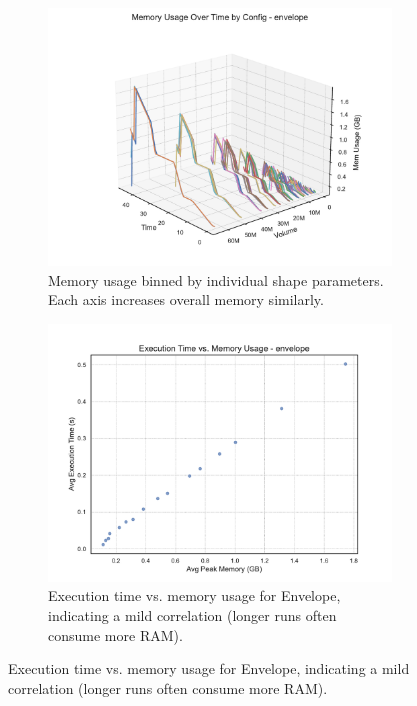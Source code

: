 \begin{figure}[htbp]
    \centering
    \begin{subfigure}[t]{0.49\textwidth}
        \centering
        \includegraphics[width=\textwidth]{assets/images/05/memory_usage_by_configuration_envelope}
        \caption{Memory usage binned by individual shape parameters. Each axis increases overall memory similarly.}
    \end{subfigure}
    \hfill
    \begin{subfigure}[t]{0.49\textwidth}
        \centering
        \includegraphics[width=\textwidth]{assets/images/05/execution_time_vs_memory_envelope}
        \caption{Execution time vs. memory usage for Envelope, indicating a mild correlation (longer runs often consume more \ac{RAM}).}

\end{subfigure}
\end{figure}
